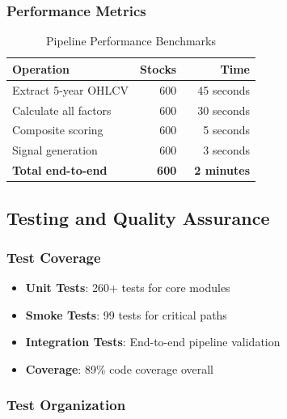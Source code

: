 \documentclass[11pt, a4paper, twoside]{article}
\begin{document}
\subsubsection{Performance Metrics}

\begin{table}[H]
    \centering
    \caption{Pipeline Performance Benchmarks}
    \label{tab:performance}
    \begin{tabular}{|l|r|r|}
        \hline
        \textbf{Operation} & \textbf{Stocks} & \textbf{Time} \\
        \hline
        Extract 5-year OHLCV & 600 & ~45 seconds \\
        \hline
        Calculate all factors & 600 & ~30 seconds \\
        \hline
        Composite scoring & 600 & ~5 seconds \\
        \hline
        Signal generation & 600 & ~3 seconds \\
        \hline
        \textbf{Total end-to-end} & \textbf{600} & \textbf{~2 minutes} \\
        \hline
    \end{tabular}
\end{table}

\subsection{Testing and Quality Assurance}

\subsubsection{Test Coverage}

\begin{itemize}
    \item \textbf{Unit Tests}: 260+ tests for core modules
    \item \textbf{Smoke Tests}: 99 tests for critical paths
    \item \textbf{Integration Tests}: End-to-end pipeline validation
    \item \textbf{Coverage}: 89\% code coverage overall
\end{itemize}

\subsubsection{Test Organization}
\end{document}
